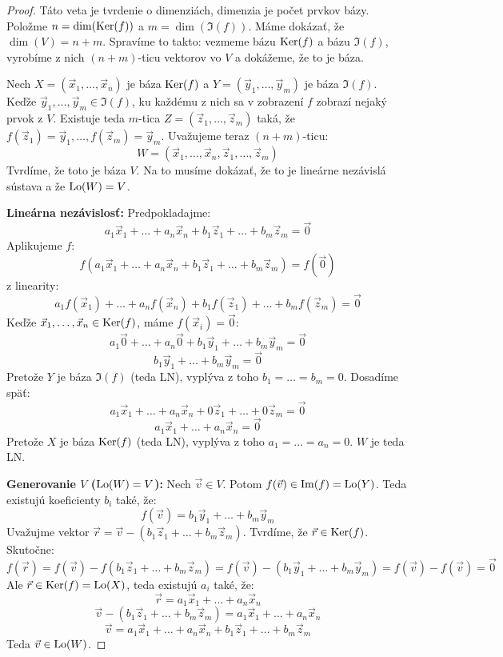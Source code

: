\begin{proof}
Táto veta je tvrdenie o dimenziách, dimenzia je počet prvkov bázy. Položme $n = \dim(\operatorname{Ker}(f))$ a $m = \dim(\Im(f))$. Máme dokázať, že $\dim(V) = n + m$. Spravíme to takto: vezmeme bázu $\operatorname{Ker}(f)$ a bázu $\Im(f)$, vyrobíme z nich $(n+m)$-ticu vektorov vo $V$ a dokážeme, že to je báza.

Nech $X = (\vec{x}_1, \dots, \vec{x}_n)$ je báza $\operatorname{Ker}(f)$ a $Y = (\vec{y}_1, \dots, \vec{y}_m)$ je báza $\Im(f)$. Keďže $\vec{y}_1, \dots, \vec{y}_m \in \Im(f)$, ku každému z nich sa v zobrazení $f$ zobrazí nejaký prvok z $V$. Existuje teda $m$-tica $Z = (\vec{z}_1, \dots, \vec{z}_m)$ taká, že $f(\vec{z}_1) = \vec{y}_1, \dots, f(\vec{z}_m) = \vec{y}_m$.
Uvažujeme teraz $(n+m)$-ticu:
\[ W = (\vec{x}_1, \dots, \vec{x}_n, \vec{z}_1, \dots, \vec{z}_m) \]
Tvrdíme, že toto je báza $V$. Na to musíme dokázať, že to je lineárne nezávislá sústava a že $\mathrm{Lo}(W) = V$.

\textbf{Lineárna nezávislosť:} Predpokladajme:
\[ a_1\vec{x}_1 + \dots + a_n\vec{x}_n + b_1\vec{z}_1 + \dots + b_m\vec{z}_m = \vec{0} \]
Aplikujeme $f$:
\[ f(a_1\vec{x}_1 + \dots + a_n\vec{x}_n + b_1\vec{z}_1 + \dots + b_m\vec{z}_m) = f(\vec{0}) \]
z linearity:
\[ a_1f(\vec{x}_1) + \dots + a_nf(\vec{x}_n) + b_1f(\vec{z}_1) + \dots + b_mf(\vec{z}_m) = \vec{0} \]
Keďže $\vec{x}_1, \dots, \vec{x}_n \in \operatorname{Ker}(f)$, máme $f(\vec{x}_i) = \vec{0}$:
\[ a_1\vec{0} + \dots + a_n\vec{0} + b_1\vec{y}_1 + \dots + b_m\vec{y}_m = \vec{0} \]
\[ b_1\vec{y}_1 + \dots + b_m\vec{y}_m = \vec{0} \]
Pretože $Y$ je báza $\Im(f)$ (teda LN), vyplýva z toho $b_1 = \dots = b_m = 0$. Dosadíme späť:
\[ a_1\vec{x}_1 + \dots + a_n\vec{x}_n + 0\vec{z}_1 + \dots + 0\vec{z}_m = \vec{0} \]
\[ a_1\vec{x}_1 + \dots + a_n\vec{x}_n = \vec{0} \]
Pretože $X$ je báza $\operatorname{Ker}(f)$ (teda LN), vyplýva z toho $a_1 = \dots = a_n = 0$. $W$ je teda LN.

\textbf{Generovanie $V$ ($\mathrm{Lo}(W) = V$):} Nech $\vec{v} \in V$. Potom $f(\vec{v}) \in \operatorname{Im}(f) = \mathrm{Lo}(Y)$. Teda existujú koeficienty $b_i$ také, že:
\[ f(\vec{v}) = b_1\vec{y}_1 + \dots + b_m\vec{y}_m \]
Uvažujme vektor $\vec{r} = \vec{v} - (b_1\vec{z}_1 + \dots + b_m\vec{z}_m)$. Tvrdíme, že $\vec{r} \in \operatorname{Ker}(f)$. Skutočne:
\[ f(\vec{r}) = f(\vec{v}) - f(b_1\vec{z}_1 + \dots + b_m\vec{z}_m) = f(\vec{v}) - (b_1\vec{y}_1 + \dots + b_m\vec{y}_m) = f(\vec{v}) - f(\vec{v}) = \vec{0} \]
Ale $\vec{r} \in \operatorname{Ker}(f) = \mathrm{Lo}(X)$, teda existujú $a_i$ také, že:
\[ \vec{r} = a_1\vec{x}_1 + \dots + a_n\vec{x}_n \]
\[ \vec{v} - (b_1\vec{z}_1 + \dots + b_m\vec{z}_m) = a_1\vec{x}_1 + \dots + a_n\vec{x}_n \]
\[ \vec{v} = a_1\vec{x}_1 + \dots + a_n\vec{x}_n + b_1\vec{z}_1 + \dots + b_m\vec{z}_m \]
Teda $\vec{v} \in \mathrm{Lo}(W)$.
\end{proof}

